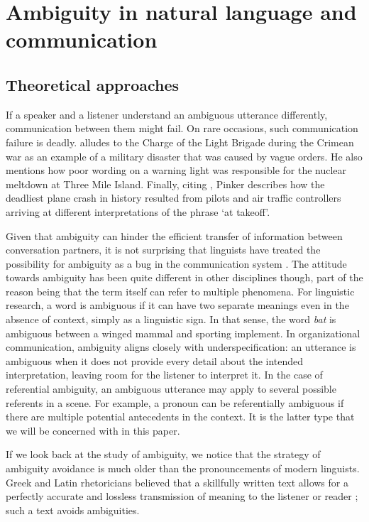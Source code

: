 \documentclass[10pt,a4paper]{article}
\begin{document}
\section{Ambiguity in natural language and communication}
\subsection{Theoretical approaches}

If a speaker and a listener understand an ambiguous utterance differently, communication between them might fail. On rare occasions, such communication failure is deadly.  alludes to the Charge of the Light Brigade during the Crimean war as an example of a military disaster that was caused by vague orders. He also mentions how poor wording on a warning light was responsible for the nuclear meltdown at Three Mile Island. Finally, citing , Pinker describes how the deadliest plane crash in history resulted from pilots and air traffic controllers arriving at different interpretations of the phrase `at takeoff'.

Given that ambiguity can hinder the efficient transfer of information between conversation partners, it is not surprising that linguists have treated the possibility for ambiguity as a bug in the communication system \cite{grice1975,chomsky2002minimalism}. The attitude towards ambiguity has been quite different in other disciplines though, part of the reason being that the term itself can refer to multiple phenomena. For linguistic research, a word is ambiguous if it can have two separate meanings even in the absence of context, simply as a linguistic sign. In that sense, the word \textit{bat} is ambiguous between a winged mammal and sporting implement. In organizational communication, ambiguity aligns closely with underspecification: an utterance is ambiguous when it does not provide every detail about the intended interpretation, leaving room for the listener to interpret it. In the case of referential ambiguity, an ambiguous utterance may apply to several possible referents in a scene. For example, a pronoun can be referentially ambiguous if there are multiple potential antecedents in the context. It is the latter type that we will be concerned with in this paper.

If we look back at the study of ambiguity, we notice that the strategy of ambiguity avoidance is much older than the pronouncements of modern linguists. Greek and Latin rhetoricians believed that a skillfully written text allows for a perfectly accurate and lossless transmission of meaning to the listener or reader \cite{ossarichardson2019}; such a text avoids ambiguities.
\end{document}
